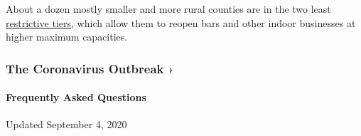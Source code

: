 About a dozen mostly smaller and more rural counties are in the two
least
\href{https://www.cdph.ca.gov/Programs/CID/DCDC/CDPH\%20Document\%20Library/COVID-19/Dimmer-Framework-August_2020.pdf}{restrictive
tiers}, which allow them to reopen bars and other indoor businesses at
higher maximum capacities.

\href{https://www.nytimes3xbfgragh.onion/news-event/coronavirus?action=click\&pgtype=Article\&state=default\&region=MAIN_CONTENT_3\&context=storylines_faq}{}

\hypertarget{the-coronavirus-outbreak-}{%
\subsubsection{The Coronavirus Outbreak
›}\label{the-coronavirus-outbreak-}}

\hypertarget{frequently-asked-questions}{%
\paragraph{Frequently Asked
Questions}\label{frequently-asked-questions}}

Updated September 4, 2020

